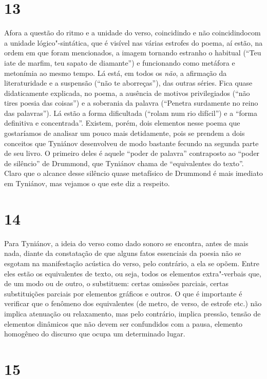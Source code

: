 \section{13}

Afora a questão do ritmo e a unidade do verso, coincidindo e não
coincidindocom a unidade lógico"-sintática, que é visível nas várias
estrofes do poema, aí estão, na ordem em que foram mencionados, a imagem
tornando estranho o habitual (``Teu iate de marfim, teu sapato de
diamante'') e funcionando como metáfora e metonímia ao mesmo tempo. Lá
está, em todos os \emph{não}, a afirmação da literaturidade e a
suspensão (``não te aborreças''), das outras séries. Fica quase
didaticamente explicada, no poema, a ausência de motivos privilegiados
(``não tires poesia das coisas'') e a soberania da palavra (``Penetra
surdamente no reino das palavras''). Lá estão a forma dificultada
(``rolam num rio difícil'') e a ``forma definitiva e concentrada''.
Existem, porém, dois elementos nesse poema que gostaríamos de analisar
um pouco mais detidamente, pois se prendem a dois conceitos que Tyniánov
desenvolveu de modo bastante fecundo na segunda parte de seu livro. O primeiro
deles é aquele ``poder de palavra'' contraposto ao ``poder de silêncio''
de Drummond, que Tyniánov chama de ``equivalentes do texto''. Claro que
o alcance desse silêncio quase metafísico de Drummond é mais imediato em
Tyniánov, mas vejamos o que este diz a respeito.

\section{14}

Para Tyniánov, a ideia do verso como dado sonoro se encontra, antes de
mais nada, diante da constatação de que alguns fatos essenciais da
poesia não se esgotam na manifestação acústica do verso, pelo contrário,
a ela se opõem. Entre eles estão os equivalentes de texto, ou seja,
todos os elementos extra"-verbais que, de um modo ou de outro, o
substituem: certas omissões parciais, certas substituições parciais por
elementos gráficos e outros. O que é importante é verificar que o
fenômeno dos equivalentes (de metro, de verso, de estrofe etc.) não
implica atenuação ou relaxamento, mas pelo contrário, implica pressão,
tensão de elementos dinâmicos que não devem ser confundidos com a pausa,
elemento homogêneo do discurso que ocupa um determinado lugar.

\section{15}

